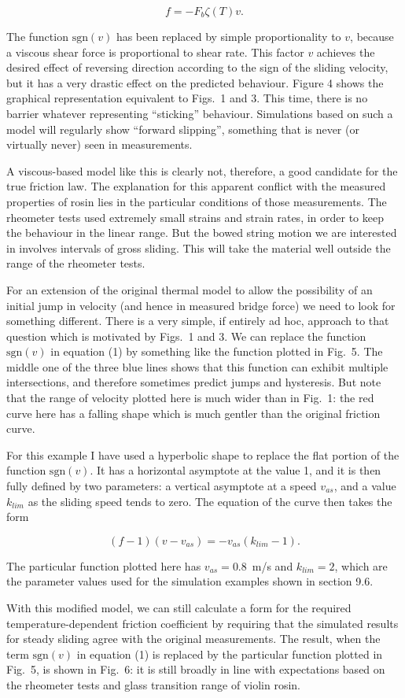   $$f=-F_b \zeta(T) v . \tag{2}$$ 

  The function $\mathrm{sgn}(v)$ has been replaced by simple proportionality to 
  $v$, because a viscous shear force is proportional to shear rate. This factor 
  $v$ achieves the desired effect of reversing direction according to the sign 
  of the sliding velocity, but it has a very drastic effect on the predicted 
  behaviour. Figure 4 shows the graphical representation equivalent to Figs.\ 1 
  and 3. This time, there is no barrier whatever representing ``sticking'' 
  behaviour. Simulations based on such a model will regularly show ``forward 
  slipping'', something that is never (or virtually never) seen in 
  measurements. 

  A viscous-based model like this is clearly not, therefore, a good candidate 
  for the true friction law. The explanation for this apparent conflict with 
  the measured properties of rosin lies in the particular conditions of those 
  measurements. The rheometer tests used extremely small strains and strain 
  rates, in order to keep the behaviour in the linear range. But the bowed 
  string motion we are interested in involves intervals of gross sliding. This 
  will take the material well outside the range of the rheometer tests. 

  For an extension of the original thermal model to allow the possibility of an 
  initial jump in velocity (and hence in measured bridge force) we need to look 
  for something different. There is a very simple, if entirely ad hoc, approach 
  to that question which is motivated by Figs.\ 1 and 3. We can replace the 
  function $\mathrm{sgn}(v)$ in equation (1) by something like the function 
  plotted in Fig.\ 5. The middle one of the three blue lines shows that this 
  function can exhibit multiple intersections, and therefore sometimes predict 
  jumps and hysteresis. But note that the range of velocity plotted here is 
  much wider than in Fig.\ 1: the red curve here has a falling shape which is 
  much gentler than the original friction curve. 

  For this example I have used a hyperbolic shape to replace the flat portion 
  of the function $\mathrm{sgn}(v)$. It has a horizontal asymptote at the value 
  1, and it is then fully defined by two parameters: a vertical asymptote at a 
  speed $v_{as}$, and a value $k_{lim}$ as the sliding speed tends to zero. The 
  equation of the curve then takes the form 

  $$(f-1)(v-v_{as})=-v_{as} (k_{lim}-1) . \tag{3}$$ 

  The particular function plotted here has $v_{as}=0.8$ m/s and $k_{lim}=2$, 
  which are the parameter values used for the simulation examples shown in 
  section 9.6. 

  With this modified model, we can still calculate a form for the required 
  temperature-dependent friction coefficient by requiring that the simulated 
  results for steady sliding agree with the original measurements. The result, 
  when the term $\mathrm{sgn}(v)$ in equation (1) is replaced by the particular 
  function plotted in Fig.\ 5, is shown in Fig.\ 6: it is still broadly in line 
  with expectations based on the rheometer tests and glass transition range of 
  violin rosin. 